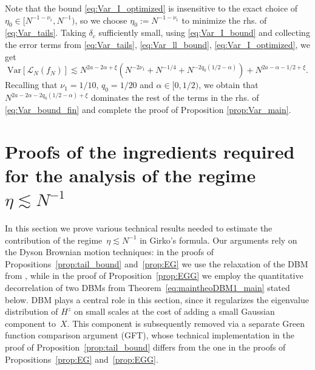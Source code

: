 \documentclass[10pt]{amsart}
\numberwithin{equation}{section}
\newcommand{\Var}{\mathrm{Var}}
\begin{document}
Note that the bound \eqref{eq:Var_I_optimized} is insensitive to the exact choice of $\eta_0\in [N^{-1-\nu_1},N^{-1})$, so we choose $\eta_0:=N^{-1-\nu_1}$ to minimize the rhs. of \eqref{eq:Var_tails}. Taking $\delta_c$ sufficiently small, using \eqref{eq:Var_I_bound} and collecting the error terms from \eqref{eq:Var_tails}, \eqref{eq:Var_ll_bound}, \eqref{eq:Var_I_optimized}, we get
\begin{equation}
\Var\left[\mathcal{L}_N(f_N)\right] \lesssim N^{2a-2\alpha+\xi}\left(N^{-2\nu_1} + N^{-1/4} + N^{-2q_0(1/2-\alpha)}\right) + N^{2a-\alpha-1/2+\xi}.
\label{eq:Var_bound_fin}
\end{equation}
Recalling that $\nu_1=1/10$, $q_0=1/20$ and $\alpha\in [0,1/2)$, we obtain that $N^{2a-2\alpha-2q_0(1/2-\alpha)+\xi}$ dominates the rest of the terms in the rhs. of \eqref{eq:Var_bound_fin} and complete the proof of Proposition \ref{prop:Var_main}.






\section{Proofs of the ingredients required for the analysis of the regime $\eta\lesssim N^{-1}$}\label{sec:proofprop}

In this section we prove various technical results needed to estimate the contribution of the regime~$\eta\lesssim N^{-1}$ in Girko's formula. Our arguments rely on the Dyson Brownian motion techniques: in the proofs of Propositions~\ref{prop:tail_bound} and~\ref{prop:EG} we use the relaxation of the DBM from \cite[Proposition~4.6]{bourgade2024fluctuations}, while in the proof of Proposition~\ref{prop:EGG} we employ the quantitative decorrelation of two DBMs from Theorem~\ref{eq:maintheoDBM1_main} stated below. DBM plays a central role in this section, since it regularizes the eigenvalue distribution of $H^z$ on small scales at the cost of adding a small Gaussian component to~$X$. 
This component is subsequently removed via a separate Green function comparison argument (GFT), whose technical implementation in the proof of Proposition~\ref{prop:tail_bound} differs from the one in the proofs of Propositions~\ref{prop:EG} and~\ref{prop:EGG}.
\end{document}
